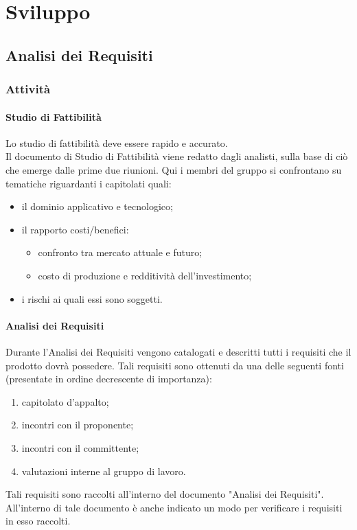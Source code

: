 \section{Sviluppo}
	\subsection{Analisi dei Requisiti}
		\subsubsection{Attività}
			\paragraph{Studio di Fattibilità}
				Lo studio di fattibilità deve essere rapido e accurato.\\
				Il documento di Studio di Fattibilità viene redatto dagli analisti, sulla base di ciò che emerge dalle prime due riunioni. Qui i membri del gruppo si confrontano su tematiche riguardanti i capitolati quali:
				\begin{itemize}
					\item il dominio applicativo e tecnologico;
					\item il rapporto costi/benefici:
					\begin{itemize}
						\item confronto tra mercato attuale e futuro;
						\item costo di produzione e redditività dell'investimento;
					\end{itemize}
					\item i rischi ai quali essi sono soggetti.
				\end{itemize}
			\paragraph{Analisi dei Requisiti}
				Durante l'Analisi dei Requisiti vengono catalogati e descritti tutti i requisiti che il prodotto dovrà possedere. Tali requisiti sono ottenuti da una delle seguenti fonti (presentate in ordine decrescente di importanza):
				\begin{enumerate}
					\item capitolato d’appalto;
					\item incontri con il proponente;
					\item incontri con il committente;
					\item valutazioni interne al gruppo di lavoro.
				\end{enumerate}
				Tali requisiti sono raccolti all'interno del documento "Analisi dei Requisiti". All'interno di tale documento è anche indicato un modo per verificare i requisiti in esso raccolti.

